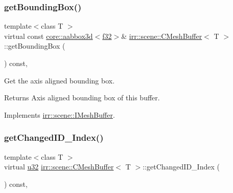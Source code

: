 \subsubsection{\texorpdfstring{get\+Bounding\+Box()}{getBoundingBox()}\hspace{0.1cm}{\footnotesize\ttfamily [2/2]}}
{\footnotesize\ttfamily template$<$class T $>$ \\
virtual const \hyperlink{classirr_1_1core_1_1aabbox3d}{core\+::aabbox3d}$<$\hyperlink{namespaceirr_a0277be98d67dc26ff93b1a6a1d086b07}{f32}$>$\& \hyperlink{classirr_1_1scene_1_1CMeshBuffer}{irr\+::scene\+::\+C\+Mesh\+Buffer}$<$ T $>$\+::get\+Bounding\+Box (\begin{DoxyParamCaption}{ }\end{DoxyParamCaption}) const\hspace{0.3cm}{\ttfamily [inline]}, {\ttfamily [virtual]}}



Get the axis aligned bounding box. 

\begin{DoxyReturn}{Returns}
Axis aligned bounding box of this buffer. 
\end{DoxyReturn}


Implements \hyperlink{classirr_1_1scene_1_1IMeshBuffer_ac53fe1096756a40f25dae25911e27c51}{irr\+::scene\+::\+I\+Mesh\+Buffer}.

\mbox{\label{classirr_1_1scene_1_1CMeshBuffer_aec6786022abd81ddf8d4e79a23628944}} 
\subsubsection{\texorpdfstring{get\+Changed\+I\+D\+\_\+\+Index()}{getChangedID\_Index()}\hspace{0.1cm}{\footnotesize\ttfamily [1/2]}}
{\footnotesize\ttfamily template$<$class T $>$ \\
virtual \hyperlink{namespaceirr_a0416a53257075833e7002efd0a18e804}{u32} \hyperlink{classirr_1_1scene_1_1CMeshBuffer}{irr\+::scene\+::\+C\+Mesh\+Buffer}$<$ T $>$\+::get\+Changed\+I\+D\+\_\+\+Index (\begin{DoxyParamCaption}{ }\end{DoxyParamCaption}) const\hspace{0.3cm}{\ttfamily [inline]}, {\ttfamily [virtual]}}



